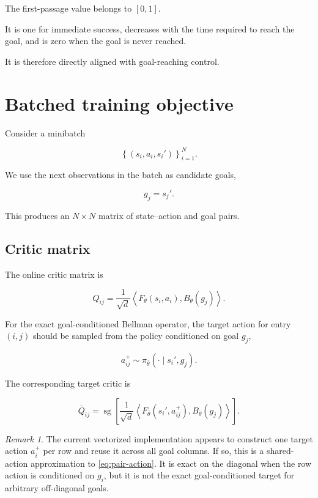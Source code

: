 \documentclass[11pt]{article}
\newcommand{\sg}{\operatorname{sg}}
\newcommand{\inner}[2]{\left\langle #1,#2\right\rangle}
\theoremstyle{remark}
\newtheorem{remark}{Remark}
\begin{document}
The first-passage value belongs to $[0,1]$.

It is one for immediate success, decreases with the time required to reach the goal, and is zero when the goal is never reached.

It is therefore directly aligned with goal-reaching control.

\section{Batched training objective}

Consider a minibatch

\begin{equation}
\left\{(s_i,a_i,s_i')\right\}_{i=1}^N.
\end{equation}

We use the next observations in the batch as candidate goals,

\begin{equation}
g_j=s_j'.
\end{equation}

This produces an $N\times N$ matrix of state--action and goal pairs.

\subsection{Critic matrix}

The online critic matrix is

\begin{equation}
Q_{ij}=\frac{1}{\sqrt d}\inner{F_\theta(s_i,a_i)}{B_\theta(g_j)}.
\label{eq:q-matrix}
\end{equation}

For the exact goal-conditioned Bellman operator, the target action for entry $(i,j)$ should be sampled from the policy conditioned on goal $g_j$,

\begin{equation}
a_{ij}^+\sim\pi_{\bar\theta}(\cdot\mid s_i',g_j).
\label{eq:pair-action}
\end{equation}

The corresponding target critic is

\begin{equation}
\bar Q_{ij}=\sg\left[\frac{1}{\sqrt d}\inner{F_{\bar\theta}(s_i',a_{ij}^+)}{B_{\bar\theta}(g_j)}\right].
\label{eq:target-q}
\end{equation}

\begin{remark}
The current vectorized implementation appears to construct one target action $a_i^+$ per row and reuse it across all goal columns.
If so, this is a shared-action approximation to \eqref{eq:pair-action}.
It is exact on the diagonal when the row action is conditioned on $g_i$, but it is not the exact goal-conditioned target for arbitrary off-diagonal goals.
\end{remark}
\end{document}
